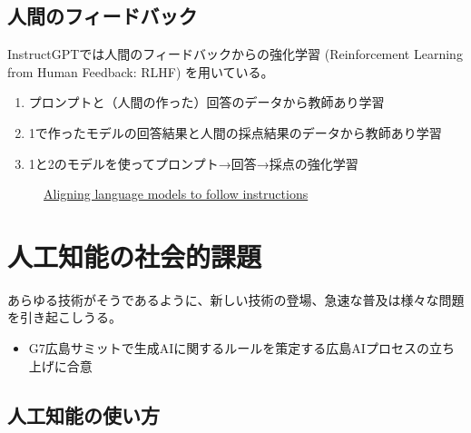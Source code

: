 \documentclass[
  xelatex,
  ja=standard]{bxjsarticle}
\providecommand{\tightlist}{%
  \setlength{\itemsep}{0pt}\setlength{\parskip}{0pt}}\usepackage{longtable,booktabs,array}
\begin{document}
\hypertarget{ux4ebaux9593ux306eux30d5ux30a3ux30fcux30c9ux30d0ux30c3ux30af}{%
\subsection{人間のフィードバック}\label{ux4ebaux9593ux306eux30d5ux30a3ux30fcux30c9ux30d0ux30c3ux30af}}

InstructGPTでは人間のフィードバックからの強化学習 (Reinforcement
Learning from Human Feedback: RLHF) を用いている。

\begin{enumerate}
\def\labelenumi{\arabic{enumi}.}
\tightlist
\item
  プロンプトと（人間の作った）回答のデータから教師あり学習
\item
  1で作ったモデルの回答結果と人間の採点結果のデータから教師あり学習
\item
  1と2のモデルを使ってプロンプト→回答→採点の強化学習
\end{enumerate}

\begin{figure}[htpb]

{\centering 

}

\caption{\href{https://openai.com/research/instruction-following}{Aligning
language models to follow instructions}}

\end{figure}

\hypertarget{ux4ebaux5de5ux77e5ux80fdux306eux793eux4f1aux7684ux8ab2ux984c}{%
\section{人工知能の社会的課題}\label{ux4ebaux5de5ux77e5ux80fdux306eux793eux4f1aux7684ux8ab2ux984c}}

あらゆる技術がそうであるように、新しい技術の登場、急速な普及は様々な問題を引き起こしうる。

\begin{itemize}
\tightlist
\item
  G7広島サミットで生成AIに関するルールを策定する広島AIプロセスの立ち上げに合意
\end{itemize}

\hypertarget{ux4ebaux5de5ux77e5ux80fdux306eux4f7fux3044ux65b9}{%
\subsection{人工知能の使い方}\label{ux4ebaux5de5ux77e5ux80fdux306eux4f7fux3044ux65b9}}
\end{document}

